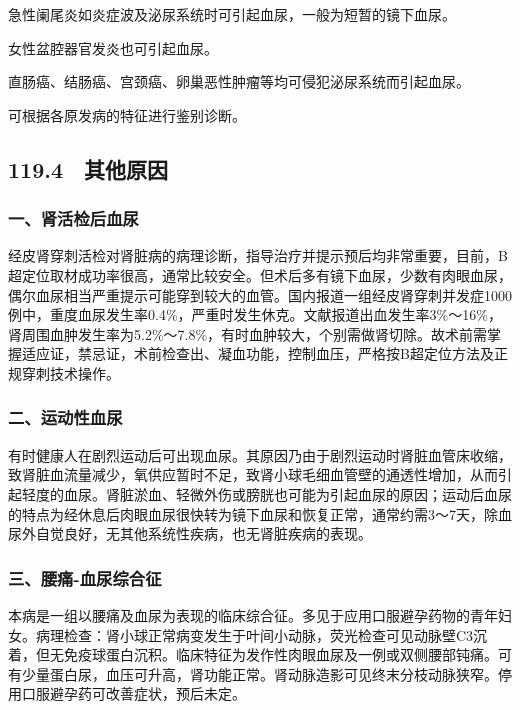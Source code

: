 急性阑尾炎如炎症波及泌尿系统时可引起血尿，一般为短暂的镜下血尿。

女性盆腔器官发炎也可引起血尿。

直肠癌、结肠癌、宫颈癌、卵巢恶性肿瘤等均可侵犯泌尿系统而引起血尿。

可根据各原发病的特征进行鉴别诊断。

\protect\hypertarget{text00280.html}{}{}

\subsection{119.4　其他原因}

\subsubsection{一、肾活检后血尿}

经皮肾穿刺活检对肾脏病的病理诊断，指导治疗并提示预后均非常重要，目前，B超定位取材成功率很高，通常比较安全。但术后多有镜下血尿，少数有肉眼血尿，偶尔血尿相当严重提示可能穿到较大的血管。国内报道一组经皮肾穿刺并发症1000例中，重度血尿发生率0.4\%，严重时发生休克。文献报道出血发生率3\%～16\%，肾周围血肿发生率为5.2\%～7.8\%，有时血肿较大，个别需做肾切除。故术前需掌握适应证，禁忌证，术前检查出、凝血功能，控制血压，严格按B超定位方法及正规穿刺技术操作。

\subsubsection{二、运动性血尿}

有时健康人在剧烈运动后可出现血尿。其原因乃由于剧烈运动时肾脏血管床收缩，致肾脏血流量减少，氧供应暂时不足，致肾小球毛细血管壁的通透性增加，从而引起轻度的血尿。肾脏淤血、轻微外伤或膀胱也可能为引起血尿的原因；运动后血尿的特点为经休息后肉眼血尿很快转为镜下血尿和恢复正常，通常约需3～7天，除血尿外自觉良好，无其他系统性疾病，也无肾脏疾病的表现。

\subsubsection{三、腰痛-血尿综合征}

本病是一组以腰痛及血尿为表现的临床综合征。多见于应用口服避孕药物的青年妇女。病理检查：肾小球正常病变发生于叶间小动脉，荧光检查可见动脉壁C3沉着，但无免疫球蛋白沉积。临床特征为发作性肉眼血尿及一例或双侧腰部钝痛。可有少量蛋白尿，血压可升高，肾功能正常。肾动脉造影可见终末分枝动脉狭窄。停用口服避孕药可改善症状，预后未定。

